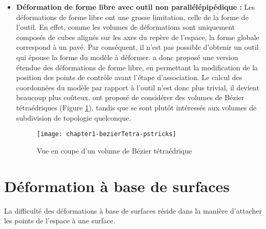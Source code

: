 \begin{itemize}
\item{\textbf{Déformation de forme libre avec outil non parallélépipédique :}}
Les déformations de forme libre ont une grosse limitation, celle de la forme
de l'outil. En effet, comme les volumes de déformations sont uniquement
composés de cubes alignés sur les axes du repère de l'espace, la forme globale
correspond à un pavé. Par conséquent, il n'est pas possible d'obtenir un outil
qui épouse la forme du modèle à déformer. \cite{Coq90} a donc proposé une
version étendue des déformations de forme libre, en permettant la modification
de la position des points de contrôle avant l'étape d'association. Le calcul
des coordonnées du modèle par rapport à l'outil n'est donc plus trivial, il
devient beaucoup plus coûteux. \cite{BBT97} ont proposé de considérer des
volumes de Bézier tétraédriques (Figure \ref{SURTet}). tandis que \cite{MJ96}
se sont plutôt intéressés aux volumes de subdivision de topologie quelconque.

\begin{figure}[ht]
\begin{center}
	\texttt{[image: chapter1-bezierTetra-pstricks]}
  \caption[Volume de Bézier tétraédrique] {Vue en coupe d'un volume de
  Bézier tétraédrique}
  \label{SURTet}
\end{center}
\end{figure}

\end{itemize}

\section{Déformation à base de surfaces} 

La difficulté des déformations à base de surfaces réside dans la manière
d'attacher les points de l'espace à une surface.

